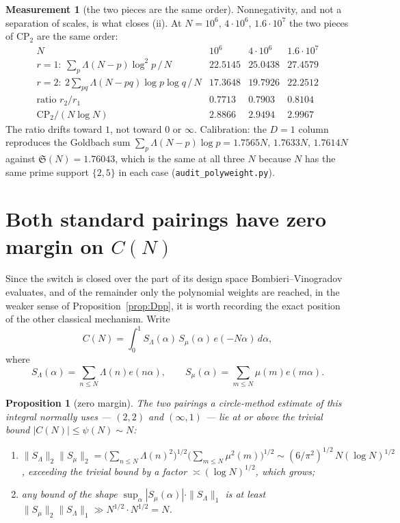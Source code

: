 \documentclass[11pt,a4paper]{article}
\theoremstyle{plain}
\newtheorem{proposition}[theorem]{Proposition}
\theoremstyle{definition}
\newtheorem{measurement}[theorem]{Measurement}
\theoremstyle{remark}
\renewcommand{\SS}{\mathfrak{S}}
\begin{document}
\begin{measurement}[the two pieces are the same order]\label{meas:poly}
Nonnegativity, and not a separation of scales, is what closes (ii).
At $N=10^6,\,4\cdot10^6,\,1.6\cdot10^7$ the two pieces of
$\mathrm{CP}_2$ are the same order:
\[
\begin{array}{r|ccc}
 N & 10^6 & 4\cdot10^6 & 1.6\cdot10^7\\\hline
 r=1:\ \sum_p\Lambda(N-p)\log^2p\,/\,N & 22.5145 & 25.0438 & 27.4579\\
 r=2:\ 2\sum_{pq}\Lambda(N-pq)\log p\log q\,/\,N
   & 17.3648 & 19.7926 & 22.2512\\
 \text{ratio } r_2/r_1 & 0.7713 & 0.7903 & 0.8104\\
 \mathrm{CP}_2/(N\log N) & 2.8866 & 2.9494 & 2.9967
\end{array}
\]
The ratio drifts toward $1$, not toward $0$ or $\infty$. Calibration:
the $D=1$ column reproduces the Goldbach sum
$\sum_p\Lambda(N-p)\log p=1.7565N,\,1.7633N,\,1.7614N$ against
$\SS(N)=1.76043$, which is the same at all three $N$ because
$N$ has the same prime support $\{2,5\}$ in each case
(\texttt{audit\_polyweight.py}).
\end{measurement}

\section{Both standard pairings have zero margin on
\texorpdfstring{$C(N)$}{C(N)}}\label{sec:circle}

Since the switch is closed over the part of its design space
Bombieri--Vinogradov evaluates, and of the remainder only the
polynomial weights are reached, in the weaker sense of
Proposition~\ref{prop:Dpp}, it is worth
recording the exact position of the other classical mechanism. Write
\[
  C(N)=\int_0^1S_\Lambda(\alpha)\,S_\mu(\alpha)\,e(-N\alpha)\,d\alpha,
\]
where
\[
  S_\Lambda(\alpha)=\sum_{n\le N}\Lambda(n)e(n\alpha),
  \qquad
  S_\mu(\alpha)=\sum_{m\le N}\mu(m)e(m\alpha).
\]

\begin{proposition}[zero margin]\label{prop:E}
The two pairings a circle-method estimate of this integral normally uses
--- $(2,2)$ and $(\infty,1)$ --- lie at or above the
trivial bound $|C(N)|\le\psi(N)\sim N$:
\begin{enumerate}
\item[(i)] $\|S_\Lambda\|_2\|S_\mu\|_2
   =\bigl(\sum_{n\le N}\Lambda(n)^2\bigr)^{1/2}
     \bigl(\sum_{m\le N}\mu^2(m)\bigr)^{1/2}
   \sim(6/\pi^2)^{1/2}\,N(\log N)^{1/2}$, exceeding the trivial bound
   by a factor $\asymp(\log N)^{1/2}$, which \emph{grows};
\item[(ii)] any bound of the shape
  $\sup_\alpha|S_\mu(\alpha)|\cdot\|S_\Lambda\|_1$ is at least
  $\|S_\mu\|_2\|S_\Lambda\|_1\gg N^{1/2}\cdot N^{1/2}=N$.
\end{enumerate}
\end{proposition}
\end{document}
